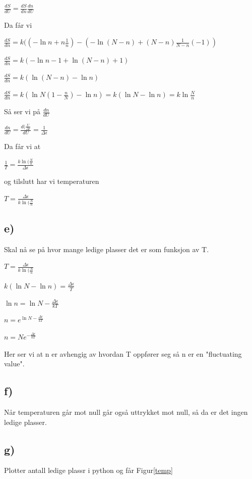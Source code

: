 \documentclass[12pt]{article}
\begin{document}
$\frac{dS}{dU} =\frac{dS}{dn}\frac{dn}{dU} $

Da får vi 

$\frac{dS}{dn} = k ((-\ln n + n\frac{1}{n}) -(-\ln (N-n) +(N-n)\frac{1}{N-n}(-1))$

$\frac{dS}{dn} = k(-\ln n -1 + \ln (N-n) +1)$

$ \frac{dS}{dn}= k(\ln (N-n) -\ln n)$

$ \frac{dS}{dn}= k(\ln N(1 -\frac{n}{N}) -\ln n) = k(\ln N -\ln n) = k \ln\frac{N}{n}$


Så ser vi på $\frac{dn}{dU}$

$\frac{dn}{dU} = \frac{d(\frac{U}{\Delta \epsilon}}{dU} = \frac{1}{\Delta \epsilon}$

Da får vi at 

$\frac{1}{T} = \frac{k\ln (\frac{N}{n}}{\Delta \epsilon}$

og tilslutt har vi temperaturen

$T = \frac{\Delta \epsilon}{k\ln (\frac{N}{n}}$

\subsection*{e)}

Skal nå se på hvor mange ledige plasser det er som funksjon av T.

$T = \frac{\Delta \epsilon}{k\ln (\frac{N}{n}}$

$k(\ln N -\ln n) = \frac{\Delta \epsilon}{T}$	

$\ln n =\ln N - \frac{\Delta \epsilon}{kT}$	

$ n = e^{\ln N -\frac{\Delta \epsilon}{kT}}$

$ n = Ne^{-\frac{\Delta \epsilon}{kT}}$

Her ser vi at n er avhengig av hvordan T oppfører seg så n er en "fluctuating value".

\subsection*{f)}

Når temperaturen går mot null går også uttrykket mot null, så da er det ingen ledige plasser. 

\subsection*{g)}

Plotter antall ledige plassr i python og får Figur\ref{temp}
\end{document}
